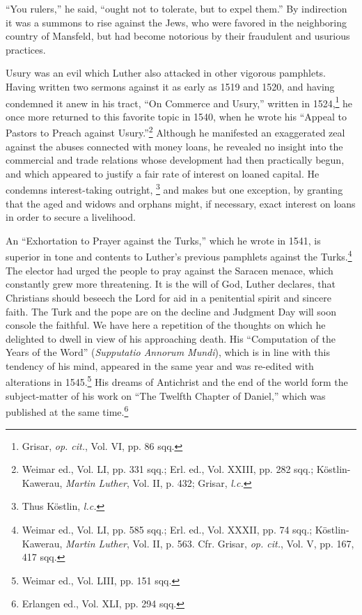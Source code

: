 “You rulers,” he said,
“ought not to tolerate, but to expel them.” By indirection it was a
summons to rise against the Jews, who were favored in the neighboring
country of Mansfeld, but had become notorious by their fraudulent
and usurious practices.

Usury was an evil which Luther also attacked in other vigorous
pamphlets. Having written two sermons against it as early as 1519
and 1520, and having condemned it anew in his tract, “On Commerce
and Usury,” written in 1524,\footnote{Grisar, \textit{op. cit.}, Vol. VI, pp. 86 sqq.}
he once more returned to this
favorite topic in 1540, when he wrote his “Appeal to Pastors to
Preach against Usury.”\footnote
{Weimar ed., Vol. LI, pp. 331 sqq.; Erl. ed., Vol. XXIII, pp. 282 sqq.; Köstlin-Kawerau,
\textit{Martin Luther}, Vol. II, p. 432; Grisar, \textit{l.c.}}
Although he manifested an exaggerated
zeal against the abuses connected with money loans, he revealed no
insight into the commercial and trade relations whose development
had then practically begun, and which appeared to justify a fair rate
of interest on loaned capital. He condemns interest-taking outright,
\footnote{Thus Köstlin, \textit{l.c.}}
and makes but one exception, by granting that the aged and widows
and orphans might, if necessary, exact interest on loans in order to
secure a livelihood.

An “Exhortation to Prayer against the Turks,” which he wrote in
1541, is superior in tone and contents to Luther’s previous pamphlets
against the Turks.\footnote
{Weimar ed., Vol. LI, pp. 585 sqq.; Erl. ed., Vol. XXXII, pp. 74 sqq.; Köstlin-Kawerau,
\textit{Martin Luther}, Vol. II, p. 563. Cfr. Grisar, \textit{op. cit.}, Vol. V, pp. 167, 417 sqq.}
The elector had urged the people to pray against
the Saracen menace, which constantly grew more threatening. It is
the will of God, Luther declares, that Christians should beseech the
Lord for aid in a penitential spirit and sincere faith. The Turk and the
pope are on the decline and Judgment Day will soon console the faithful.
We have here a repetition of the thoughts on which he delighted
to dwell in view of his approaching death. His “Computation of the
Years of the Word” (\textit{Supputatio Annorum Mundi}), which is in line
with this tendency of his mind, appeared in the same year and was
re-edited with alterations in 1545.\footnote{Weimar ed., Vol. LIII, pp. 151 sqq.}
His dreams of Antichrist and the
end of the world form the subject-matter of his work on “The
Twelfth Chapter of Daniel,” which was published at the same time.\footnote{Erlangen ed., Vol. XLI, pp. 294 sqq.}


